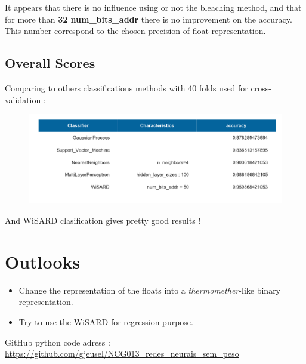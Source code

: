 \documentclass[a4paper, 11pt]{article}
\begin{document}
It appears that there is no influence using or not the
bleaching method, and that for more than \textbf{32 num\_bits\_addr} there is no
improvement on the accuracy. This number correspond to the chosen precision of
float representation.


\subsection{Overall Scores}

Comparing to others classifications methods with 40 folds used for
cross-validation :
\begin{figure}[H]
\begin{center}
  \includegraphics[width=\linewidth]{../figures_trabalho_final/overall_results.png}
\end{center}
\end{figure}

And WiSARD clasification gives pretty good results !


\section{Outlooks}

\begin{itemize}
  \item Change the representation of the floats into a \emph{thermomether}-like
    binary representation.
  \item Try to use the WiSARD for regression purpose.
\end{itemize}

GitHub python code adress : \url{https://github.com/gjeusel/NCG013_redes_neurais_sem_peso}
\end{document}

